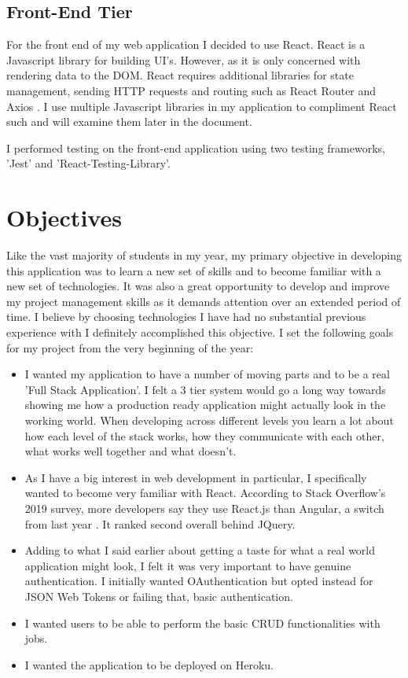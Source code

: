 \subsection{Front-End Tier}
For the front end of my web application I decided to use React. React is a Javascript library for building UI's. However, as it is only concerned with rendering data to the DOM. React requires  additional libraries for state management, sending HTTP requests and routing such as React Router and Axios \cite{wiki:xxx}. I use multiple Javascript libraries in my application to compliment React such and will examine them later in the document.

I performed testing on the front-end application using two testing frameworks, 'Jest' and 'React-Testing-Library'.

\section{Objectives}
Like the vast majority of students in my year, my primary objective in developing this application was to learn a new set of skills and to become familiar with a new set of technologies. It was also a great opportunity to develop and improve my project management skills as it demands attention over an extended period of time. I believe by choosing technologies I have had no substantial previous experience with I definitely accomplished this objective. I set the following goals for my project from the very beginning of the year:

\begin{itemize}
    \item I wanted my application to have a number of moving parts and to be a real 'Full Stack Application'. I felt a 3 tier system would go a long way towards showing me how a production ready application might actually look in the working world. When developing across different levels you learn a lot about how each level of the stack works, how they communicate with each other, what works well together and what doesn't.
    \item As I have a big interest in web development in particular, I specifically wanted to become very familiar with React. According to Stack Overflow's 2019 survey, more developers say they use React.js than Angular, a switch from last year \cite{Stack}. It ranked second overall behind JQuery.
    \item Adding to what I said earlier about getting a taste for what a real world application might look, I felt it was very important to have genuine authentication. I initially wanted OAuthentication but opted instead for JSON Web Tokens or failing that, basic authentication.
    \item I wanted users to be able to perform the basic CRUD functionalities with jobs.
    \item I wanted the application to be deployed on Heroku.

\end{itemize}

